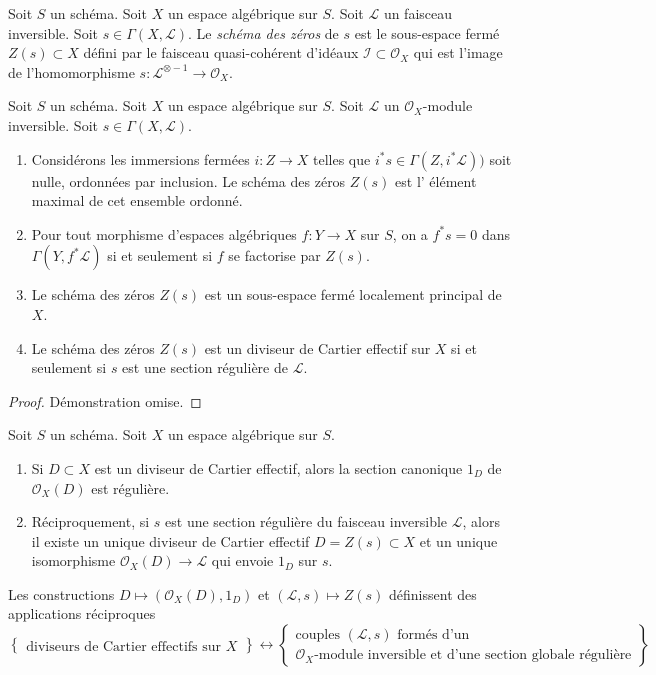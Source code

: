 \begin{definition}
\label{definition-zero-scheme-s}
Soit $S$ un schéma. Soit $X$ un espace algébrique sur $S$.
Soit $\mathcal{L}$ un faisceau inversible.
Soit $s \in \Gamma(X, \mathcal{L})$.
Le {\it schéma des zéros} de $s$ est le sous-espace fermé $Z(s) \subset X$
défini par le faisceau quasi-cohérent d'idéaux
$\mathcal{I} \subset \mathcal{O}_X$ qui est l'image de
l'homomorphisme $s : \mathcal{L}^{\otimes -1} \to \mathcal{O}_X$.
\end{definition}

\begin{lemma}
\label{lemma-zero-scheme}
Soit $S$ un schéma. Soit $X$ un espace algébrique sur $S$.
Soit $\mathcal{L}$ un $\mathcal{O}_X$-module inversible.
Soit $s \in \Gamma(X, \mathcal{L})$.
\begin{enumerate}
\item Considérons les immersions fermées $i : Z \to X$ telles que
$i^*s \in \Gamma(Z, i^*\mathcal{L}))$ soit nulle,
ordonnées par inclusion. Le schéma des zéros $Z(s)$ est l'
élément maximal de cet ensemble ordonné.
\item Pour tout morphisme d'espaces algébriques $f : Y \to X$ sur $S$,
on a $f^*s = 0$ dans $\Gamma(Y, f^*\mathcal{L})$ si et seulement si
$f$ se factorise par $Z(s)$.
\item Le schéma des zéros $Z(s)$ est un sous-espace fermé localement principal de $X$.
\item Le schéma des zéros $Z(s)$ est un diviseur de Cartier effectif sur $X$
si et seulement si $s$ est une section régulière de $\mathcal{L}$.
\end{enumerate}
\end{lemma}

\begin{proof}
Démonstration omise.
\end{proof}

\begin{lemma}
\label{lemma-characterize-OD}
Soit $S$ un schéma. Soit $X$ un espace algébrique sur $S$.
\begin{enumerate}
\item Si $D \subset X$ est un diviseur de Cartier effectif, alors
la section canonique $1_D$ de $\mathcal{O}_X(D)$ est régulière.
\item Réciproquement, si $s$ est une section régulière du faisceau
inversible $\mathcal{L}$, alors il existe un unique diviseur de Cartier
effectif $D = Z(s) \subset X$ et un unique isomorphisme
$\mathcal{O}_X(D) \to \mathcal{L}$ qui envoie $1_D$ sur $s$.
\end{enumerate}
Les constructions
$D \mapsto (\mathcal{O}_X(D), 1_D)$ et $(\mathcal{L}, s) \mapsto Z(s)$
définissent des applications réciproques
$$
\left\{
\begin{matrix}
\text{diviseurs de Cartier effectifs sur }X
\end{matrix}
\right\}
\leftrightarrow
\left\{
\begin{matrix}
\text{couples }(\mathcal{L}, s)\text{ formés d'un}\\
\mathcal{O}_X\text{-module inversible et d'une section globale régulière}
\end{matrix}
\right\}
$$
\end{lemma}

